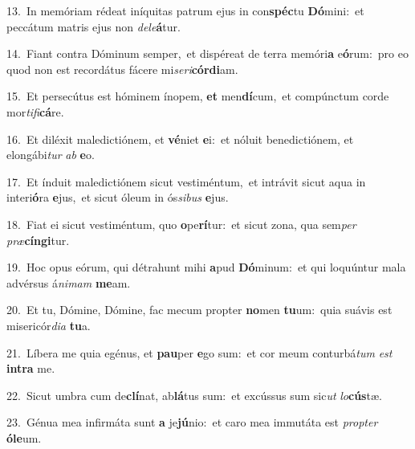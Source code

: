 {\numbfont\textcolor{\numbcolor}{13.}}~In memóriam rédeat iníquitas patrum ejus in con\-\textbf{spéc}\-tu \textbf{Dó}\-mini:~\star et peccátum matris ejus non \textit{de}\-\textit{le}\textbf{á}tur.\par
{\numbfont\textcolor{\numbcolor}{14.}}~Fiant contra Dóminum semper,~\dagger et dispéreat de terra memóri\textbf{a} e\-\textbf{ó}\-rum:~\star pro eo quod non est recordátus fácere mi\-\textit{se}\-\textit{ri}\textbf{cór}\textbf{di}am.\par
{\numbfont\textcolor{\numbcolor}{15.}}~Et persecútus est hóminem ínopem, \textbf{et} men\-\textbf{dí}\-cum,~\star et compúnctum corde mor\-\textit{ti}\-\textit{fi}\textbf{cá}re.\par
{\numbfont\textcolor{\numbcolor}{16.}}~Et diléxit maledictiónem, et \textbf{vé}\-niet \textbf{e}\-i:~\star et nóluit benedictiónem, et elongábi\textit{tur} \textit{ab} \textbf{e}\-o.\par
{\numbfont\textcolor{\numbcolor}{17.}}~Et índuit maledictiónem sicut vestiméntum,~\dagger et intrávit sicut aqua in interi\-\textbf{ó}\-ra \textbf{e}\-jus,~\star et sicut óleum in ós\-\textit{si}\-\textit{bus} \textbf{e}\-jus.\par
{\numbfont\textcolor{\numbcolor}{18.}}~Fiat ei sicut vestiméntum, quo \textbf{o}\-pe\-\textbf{rí}\-tur:~\star et sicut zona, qua sem\textit{per} \textit{præ}\-\textbf{cín}\textbf{gi}tur.\par
{\numbfont\textcolor{\numbcolor}{19.}}~Hoc opus eórum, qui détrahunt mihi \textbf{a}\-pud \textbf{Dó}\-minum:~\star et qui loquúntur mala advérsus á\-\textit{ni}\-\textit{mam} \textbf{me}\-am.\par
{\numbfont\textcolor{\numbcolor}{20.}}~Et tu, Dómine, Dómine, fac mecum propter \textbf{no}\-men \textbf{tu}\-um:~\star quia suávis est misericór\-\textit{di}\-\textit{a} \textbf{tu}\-a.\par
{\numbfont\textcolor{\numbcolor}{21.}}~Líbera me quia egénus, et \textbf{pau}\-per \textbf{e}\-go sum:~\star et cor meum conturbá\textit{tum} \textit{est} \textbf{in}\-\textbf{tra} me.\par
{\numbfont\textcolor{\numbcolor}{22.}}~Sicut umbra cum de\-\textbf{clí}\-nat, ab\-\textbf{lá}\-tus sum:~\star et excússus sum sic\textit{ut} \textit{lo}\-\textbf{cús}tæ.\par
{\numbfont\textcolor{\numbcolor}{23.}}~Génua mea infirmáta sunt \textbf{a} je\-\textbf{jú}\-nio:~\star et caro mea immutáta est \textit{prop}\-\textit{ter} \textbf{ó}\-\textbf{le}um.\par
